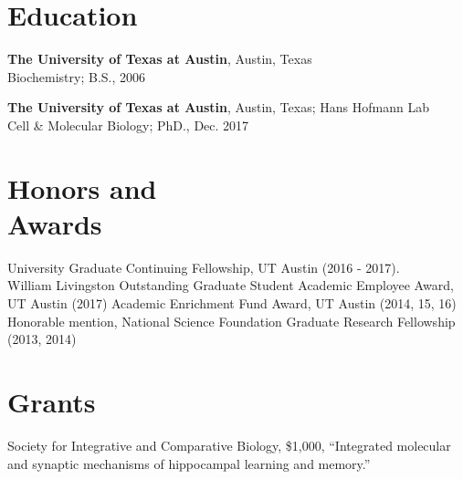 \documentclass[margin,line]{resume}
\begin{document}
\pagestyle{plain}


\begin{resume}


    \section{\mysidestyle Education}

    {\bf The University of Texas at Austin}, Austin, Texas \\Biochemistry; B.S., 2006


    {\bf The University of Texas at Austin}, Austin, Texas; Hans Hofmann Lab
\\Cell \& Molecular Biology; PhD., Dec. 2017

    \section{\mysidestyle Honors and\\Awards} 
University Graduate Continuing Fellowship, UT Austin (2016 - 2017).\\
William Livingston Outstanding Graduate Student Academic Employee Award, UT Austin (2017)
Academic Enrichment Fund Award, UT Austin (2014, 15, 16)
Honorable mention, National Science Foundation Graduate Research Fellowship (2013, 2014)


\section{\mysidestyle Grants}

Society for Integrative and Comparative Biology, \$1,000, 
``Integrated molecular and synaptic mechanisms of hippocampal learning and memory.''



\end{resume}
\end{document}
